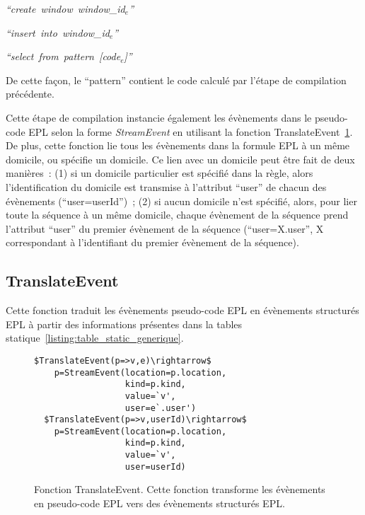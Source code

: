 {\em ``create~window~window\_id$_e$''} 

{\em ``insert~into~window\_id$_e$''} 

{\em ``select~from~pattern~[code$_e$]''}

\noindent
De cette façon, le ``pattern'' contient le code calculé par l'étape de compilation précédente.

Cette étape de compilation instancie également les évènements dans le pseudo-code EPL selon la forme {\em StreamEvent} en utilisant la fonction TranslateEvent~\ref{listing:translateevent}.
De plus, cette fonction lie tous les évènements dans la formule EPL à un même domicile, ou spécifie un domicile. Ce lien avec un domicile peut être fait de deux manières~: (1) si un domicile particulier est spécifié dans la règle, alors l'identification du domicile est transmise à l'attribut ``user'' de chacun des évènements (\eg ``user=userId'')~; (2) si aucun domicile n'est spécifié, alors, pour lier toute la séquence à un même domicile, chaque évènement de la séquence prend l'attribut ``user'' du premier évènement de la séquence (\eg ``user=X.user'', X correspondant à l'identifiant du premier évènement de la séquence).

\subsection*{TranslateEvent}
Cette fonction traduit les évènements pseudo-code EPL en évènements structurés EPL à partir
des informations présentes dans la tables statique~\ref{listing:table_static_generique}.
\begin{figure}[!h]
\begin{lstlisting}[frame=bt]
  $TranslateEvent(p=>v,e)\rightarrow$ 
    p=StreamEvent(location=p.location,
                  kind=p.kind,
                  value=`v',
                  user=e`.user')
  $TranslateEvent(p=>v,userId)\rightarrow$ 
    p=StreamEvent(location=p.location,
                  kind=p.kind,
                  value=`v',
                  user=userId)
\end{lstlisting}
\caption{Fonction TranslateEvent. Cette fonction transforme les évènements en pseudo-code EPL vers des évènements structurés EPL.}
\label{listing:translateevent}
\end{figure}

